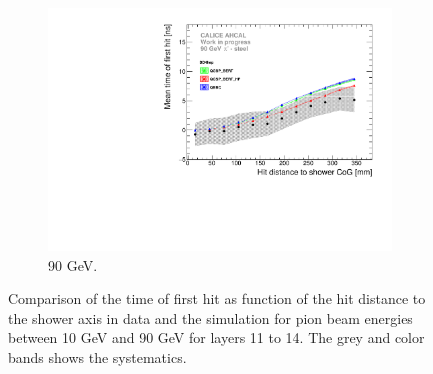 \begin{figure}[htbp!]
\begin{subfigure}[t]{0.49\textwidth}
    \includegraphics[width=1\textwidth]{../Thesis_Plots/Timing/Pions/Plots/ComparisonToSim/Time_Radius_90GeV_BL_DD4hep.pdf}
    \caption{90 GeV.} \label{fig:Radius_BL_SimData_90GeV_DD4hep}
  \end{subfigure}
  \caption{Comparison of the time of first hit as function of the hit distance to the shower axis in data and the \ddhep simulation for pion beam energies between 10 GeV and 90 GeV for layers 11 to 14. The grey and color bands shows the systematics.}
  \label{fig:Radius_BL_SimData_Comparison_DD4hep}
\end{figure}


